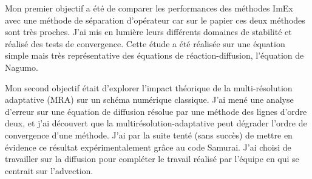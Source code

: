 Mon premier objectif a été de comparer les performances des méthodes ImEx avec une méthode de séparation d'opérateur car sur le papier ces deux méthodes sont très proches.
J'ai mis en lumière leurs différents domaines de stabilité et réalisé des tests de convergence. Cette étude a été réalisée sur une équation simple mais très représentative des équations de réaction-diffusion,
l'équation de Nagumo.\par%
Mon second objectif était d'explorer l'impact théorique de la multi-résolution adaptative (MRA) sur un schéma numérique classique.
J'ai mené une analyse d'erreur sur une équation de diffusion résolue par une méthode des lignes d'ordre deux, et j'ai découvert %
que la multirésolution-adaptative peut dégrader l'ordre de convergence d'une méthode. J'ai par la suite tenté (sans succès) de mettre en 
évidence ce résultat expérimentalement grâce au code Samurai. J'ai choisi de travailler sur la diffusion pour compléter le travail 
réalisé par l'équipe en \cite{belloti_et_al_2025} qui se centrait sur l'advection.